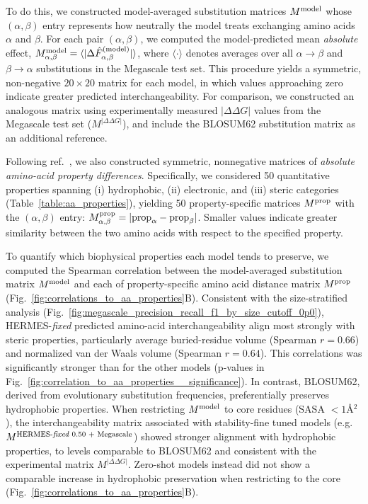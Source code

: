 To do this, we constructed model-averaged substitution matrices $M^{\text{model}}$ whose $(\alpha,\beta)$
entry represents how neutrally the model treats exchanging amino acids $\alpha$ and $\beta$. For
each pair $(\alpha,\beta)$, we computed the model-predicted mean {\em absolute} effect,
$M^{\text{model}}_{\alpha, \beta} = \langle |\Delta \hat{F}^{(\text{model})}_{\alpha,\beta} |\rangle$, where
$\langle \cdot \rangle$
denotes averages over all $\alpha\to \beta$ and $\beta\to \alpha$ substitutions in the Megascale
test set. This procedure yields a symmetric, non-negative $20\times 20$ matrix for each model, in
which values approaching zero indicate greater predicted interchangeability. For comparison, we
constructed an analogous matrix using experimentally measured $|\Delta\Delta G|$ values from the
Megascale test set ($M^{|\Delta\Delta G|}$), and include the BLOSUM62 substitution matrix as an
additional reference.

Following ref.~\cite{pyo_data-driven_2025}, we also constructed symmetric, nonnegative matrices of
\emph{absolute amino-acid property differences}. Specifically, we considered 50 quantitative
properties spanning (i) hydrophobic, (ii) electronic, and (iii) steric categories
(Table~\ref{table:aa_properties}), yielding 50 property-specific matrices $M^{\text{prop}}$ with the
$(\alpha,\beta)$ entry: $M^{\text{prop}}_{\alpha,\beta} = |\text{prop}_\alpha - \text{prop}_\beta|$. Smaller values
indicate greater similarity between the two amino acids with respect to the specified property.


To quantify which biophysical properties each model tends to preserve, we computed the Spearman
correlation between the model-averaged substitution matrix
 $M^{\text{model}}$ and each of property-specific amino acid distance matrix $M^{\text{prop}}$
 (Fig.~\ref{fig:correlations_to_aa_properties}B).
Consistent with the size-stratified analysis
(Fig.~\ref{fig:megascale_precision_recall_f1_by_size_cutoff_0p0}), HERMES-{\em fixed} predicted
amino-acid interchangeability align most strongly with steric properties, particularly average
buried-residue volume (Spearman $r =0.66$) and normalized van der Waals volume (Spearman $r =
0.64$). This correlations was significantly stronger than for the other models (p-values in
Fig.~\ref{fig:correlation_to_aa_properties__significance}).
In contrast, BLOSUM62, derived from evolutionary substitution frequencies, preferentially preserves
hydrophobic properties. When restricting $M^{\text{model}}$ to core residues (SASA $< 1$\AA$^2$), the
interchangeability matrix associated with stability-fine tuned models {(e.g.
$M^{\text{HERMES-\textit{fixed} 0.50 + Megascale}}$)} showed stronger alignment with hydrophobic
properties, to levels comparable to BLOSUM62 and consistent with the experimental matrix
$M^{|\Delta\Delta G|}$.
Zero-shot models instead did not show a comparable increase in hydrophobic preservation when
restricting to the core (Fig.~\ref{fig:correlations_to_aa_properties}B).\\




